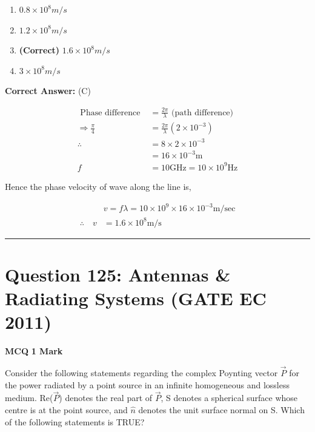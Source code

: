 \documentclass[11pt,a4paper]{article}
\begin{document}
\begin{enumerate}[label=(\Alph*)]
    \item $0.8 \times 10^{8} m/s$
    \item $1.2 \times 10^{8} m/s$
    \item \textbf{(Correct)} $1.6 \times 10^{8} m/s$
    \item $3 \times 10^{8} m/s$
\end{enumerate}

\noindent \textbf{Correct Answer:} (C)

\begin{tcolorbox}[solbox, title=Detailed Solution -- Question 124]
\[
\begin{aligned} \text { Phase difference }&=\frac{2 \pi}{\lambda} \text { (path difference) } \\ \Rightarrow \frac{\pi}{4}&=\frac{2 \pi}{\lambda}\left(2 \times 10^{-3}\right) \\ \therefore \quad &=8 \times 2 \times 10^{-3} \\ &=16 \times 10^{-3} \mathrm{m} \\ f&= 10 \mathrm{GHz}=10 \times 10^{9} \mathrm{Hz} \end{aligned}
\]

 Hence the phase velocity of wave along the line is,

\[
\begin{aligned} & v=f \lambda=10 \times 10^{9} \times 16 \times 10^{-3} \mathrm{m} / \mathrm{sec} \\ \therefore \quad v &=1.6 \times 10^{8} \mathrm{m} / \mathrm{s} \end{aligned}
\]
\end{tcolorbox}

\vspace{1.5em}
\hrule
\vspace{1.5em}

\section*{Question 125: Antennas \& Radiating Systems (GATE EC 2011)}
\noindent \textbf{\color{primary}MCQ} \hfill \textbf{\color{secondary}1 Mark}


\noindent Consider the following statements regarding the complex Poynting vector $\vec{P}$ for the power radiated by a point source in an infinite homogeneous and lossless medium. Re($\vec{P}$) denotes the real part of $\vec{P}$, S denotes a spherical surface whose centre is at the point source, and $\hat{n}$
denotes the unit surface normal on S. Which of the following statements is TRUE?
\end{document}

